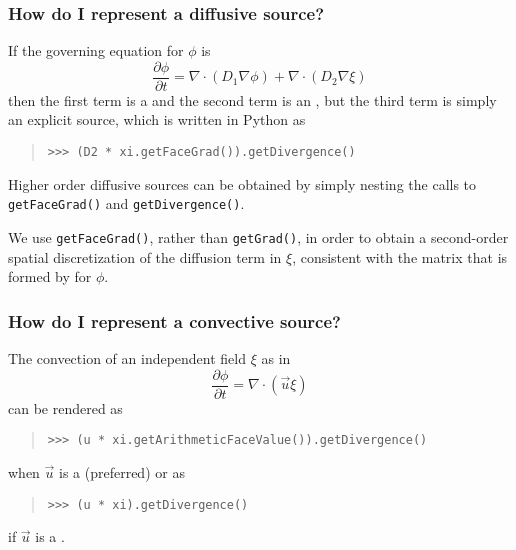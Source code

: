                 \subsubsection{How do I represent a diffusive source?}
                    If the governing equation for $\phi$ is
                    \[
                        \frac{\partial \phi}{\partial t} 
                        = \nabla\cdot\left( D_1 \nabla \phi\right)
                        + \nabla\cdot\left( D_2 \nabla \xi\right)
                    \]
                    then the first term is a  and the second term 
                    is an , but the third term is 
                    simply an explicit source, which is written in Python as
                    \begin{quote}
\begin{verbatim}
>>> (D2 * xi.getFaceGrad()).getDivergence()
\end{verbatim}
                    \end{quote}
                    Higher order diffusive sources can be obtained by
                    simply nesting the calls to \verb+getFaceGrad()+
                    and \verb+getDivergence()+.
                    \begin{reSTadmonition}[Note]
                        We use \verb|getFaceGrad()|, rather than
                        \verb|getGrad()|, in order to obtain a
                        second-order spatial discretization of the
                        diffusion term in $\xi$, consistent with the
                        matrix that is formed by
                         for $\phi$.
                    \end{reSTadmonition}

                \subsubsection{How do I represent a convective source?}
                    The convection of an independent field $\xi$ as in
                    \[
                        \frac{\partial \phi}{\partial t} 
                        = \nabla\cdot
                        \left(
                            \vec{u} \xi
                        \right)
                    \]
                    can be rendered as
                    \begin{quote}
\begin{verbatim}
>>> (u * xi.getArithmeticFaceValue()).getDivergence()
\end{verbatim}
                    \end{quote}
                    when $\vec{u}$ is a  
                    (preferred) or as
                    \begin{quote}
\begin{verbatim}
>>> (u * xi).getDivergence()
\end{verbatim}
                    \end{quote}
                    if $\vec{u}$ is a .


